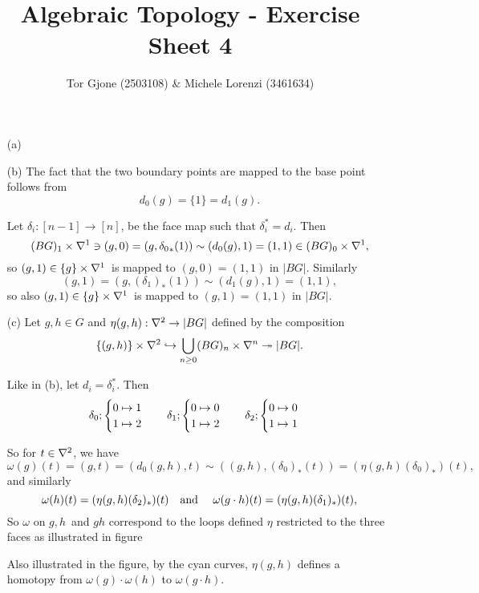 \documentclass[a4paper,11pt,english]{article}
\title{\textbf{Algebraic Topology} - Exercise Sheet 4}
\author{Tor Gjone (2503108) \& Michele Lorenzi (3461634)}
\begin{document}
\mmaketitle
\begin{exercise}[1]
\begin{enumerate}
\item[(a)]

\item[(b)]
The fact that the two boundary points are mapped to the base point follows from
\[ d_0(g) = \{1\} = d_1(g). \]

Let $\delta_i: [n-1] \to [n]$, be the face map such that $\delta_i^* = d_i$.
Then
\[ (BG)_1 \times \nabla^1 \ni (g,0) = (g,{\delta_0}_*(1)) \sim (d_0(g),1) = (1,1)
\in (BG)_0\times \nabla^1, \]
so $(g,1) \in \{g\}\times \nabla^1$ is mapped to $(g,0) = (1,1)$ in $|BG|$.
Similarly
\[ (g,1) = (g,(\delta_1)_*(1)) \sim (d_1(g),1) = (1,1), \]
so also $(g,1) \in \{g\}\times \nabla^1$ is mapped to $(g,1) = (1,1)$ in $|BG|$.

\item[(c)]
Let $g,h \in G$ and $\eta(g,h) : \nabla^2 \to |BG|$ defined by the composition
\[ \{ (g,h) \}\times \nabla^2 \hookrightarrow \bigcup_{n\ge 0} (BG)_n \times \nabla^n \twoheadrightarrow
|BG|. \]

Like in (b), let $d_i = \delta_i^*$. Then
\[
\delta_0; \begin{cases} 0\mapsto 1 \\ 1 \mapsto 2 \end{cases} \quad
\delta_1; \begin{cases} 0\mapsto 0 \\ 1 \mapsto 2 \end{cases} \quad
\delta_2; \begin{cases} 0\mapsto 0 \\ 1 \mapsto 1 \end{cases}
\]

So for $t\in \nabla^2$, we have
\[ \omega(g)(t) = (g,t) = (d_0(g,h), t) \sim
((g,h),(\delta_0)_*(t)) = (\eta(g,h) (\delta_0)_*)(t), \]
and similarly
\[ \omega(h)(t) = (\eta(g,h) (\delta_2)_*)(t) \quad\text{and }\quad
\omega(g\cdot h)(t) = (\eta(g,h) (\delta_1)_*)(t), \]
So $\omega$ on $g,h$ and $gh$ correspond to the loops defined $\eta$ restricted
to the three faces as illustrated in figure 

\begin{figure}
\caption{}
\label{fig:1}
\centering

\end{figure}

Also illustrated in the figure, by the cyan curves, $\eta(g,h)$ defines a
homotopy from $\omega(g)\cdot \omega(h)$ to $\omega(g\cdot h)$.
\end{enumerate}
\end{exercise}

\begin{exercise}[2]
\end{exercise}
\end{document}
